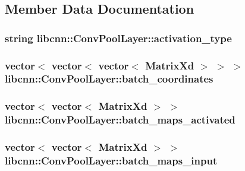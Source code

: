 \subsection{\-Member \-Data \-Documentation}
\hypertarget{classlibcnn_1_1_conv_pool_layer_aa57ba56fe0f3e38f58931137a03e07f3}{
\subsubsection[{activation\-\_\-type}]{\setlength{\rightskip}{0pt plus 5cm}string {\bf libcnn\-::\-Conv\-Pool\-Layer\-::activation\-\_\-type}}}\label{classlibcnn_1_1_conv_pool_layer_aa57ba56fe0f3e38f58931137a03e07f3}
\hypertarget{classlibcnn_1_1_conv_pool_layer_a0b8d18fc0be5f3e75813a86b24dce247}{
\subsubsection[{batch\-\_\-coordinates}]{\setlength{\rightskip}{0pt plus 5cm}vector$<$ vector$<$ vector$<$ \-Matrix\-Xd $>$ $>$ $>$ {\bf libcnn\-::\-Conv\-Pool\-Layer\-::batch\-\_\-coordinates}}}\label{classlibcnn_1_1_conv_pool_layer_a0b8d18fc0be5f3e75813a86b24dce247}
\hypertarget{classlibcnn_1_1_conv_pool_layer_ad42c5b645c6103b200b9b950b4349550}{
\subsubsection[{batch\-\_\-maps\-\_\-activated}]{\setlength{\rightskip}{0pt plus 5cm}vector$<$ vector$<$ \-Matrix\-Xd $>$ $>$ {\bf libcnn\-::\-Conv\-Pool\-Layer\-::batch\-\_\-maps\-\_\-activated}}}\label{classlibcnn_1_1_conv_pool_layer_ad42c5b645c6103b200b9b950b4349550}
\hypertarget{classlibcnn_1_1_conv_pool_layer_a63d9d97664284772029c36a897e4e30e}{
\subsubsection[{batch\-\_\-maps\-\_\-input}]{\setlength{\rightskip}{0pt plus 5cm}vector$<$ vector$<$ \-Matrix\-Xd $>$ $>$ {\bf libcnn\-::\-Conv\-Pool\-Layer\-::batch\-\_\-maps\-\_\-input}}}\label{classlibcnn_1_1_conv_pool_layer_a63d9d97664284772029c36a897e4e30e}
